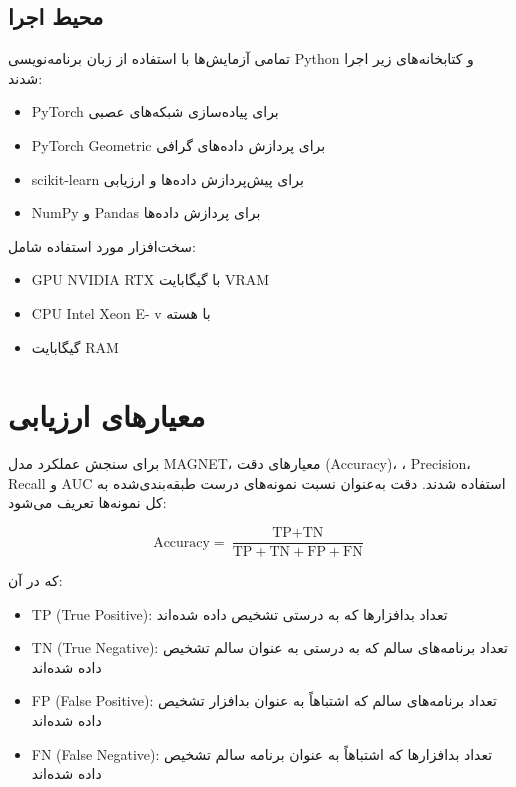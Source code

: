 \subsection{محیط اجرا}
تمامی آزمایش‌ها با استفاده از زبان برنامه‌نویسی Python  و کتابخانه‌های زیر اجرا شدند:
\begin{itemize}
    \item PyTorch  برای پیاده‌سازی شبکه‌های عصبی
    \item PyTorch Geometric  برای پردازش داده‌های گرافی
    \item scikit-learn  برای پیش‌پردازش داده‌ها و ارزیابی
    \item NumPy  و Pandas  برای پردازش داده‌ها
\end{itemize}

سخت‌افزار مورد استفاده شامل:
\begin{itemize}
    \item GPU NVIDIA RTX  با  گیگابایت VRAM
    \item CPU Intel Xeon E- v با  هسته
    \item {} گیگابایت RAM
\end{itemize}

\section{معیارهای ارزیابی}
برای سنجش عملکرد مدل MAGNET، معیارهای دقت (Accuracy)، ، Precision، Recall و AUC استفاده شدند. دقت به‌عنوان نسبت نمونه‌های درست طبقه‌بندی‌شده به کل نمونه‌ها تعریف می‌شود:

\begin{equation}
\text{Accuracy} = \frac{\text{TP} + \text{TN}}{\text{TP} + \text{TN} + \text{FP} + \text{FN}}
\end{equation}

که در آن:
\begin{itemize}
    \item TP (True Positive): تعداد بدافزارها که به درستی تشخیص داده شده‌اند
    \item TN (True Negative): تعداد برنامه‌های سالم که به درستی به عنوان سالم تشخیص داده شده‌اند
    \item FP (False Positive): تعداد برنامه‌های سالم که اشتباهاً به عنوان بدافزار تشخیص داده شده‌اند
    \item FN (False Negative): تعداد بدافزارها که اشتباهاً به عنوان برنامه سالم تشخیص داده شده‌اند
\end{itemize}

